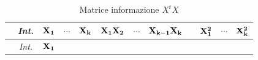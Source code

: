 \documentclass[
  11pt,
]{book}
\begin{document}
\begin{longtable}[]{@{}cccccccccccc@{}}
\caption{\label{tab:MatrInfoCCD} Matrice informazione \(X^tX\)}\tabularnewline
\toprule
\begin{minipage}[b]{0.09\columnwidth}\centering
\strut
\end{minipage} & \begin{minipage}[b]{0.05\columnwidth}\centering
\emph{Int.}\strut
\end{minipage} & \begin{minipage}[b]{0.05\columnwidth}\centering
\(\bf{X_1}\)\strut
\end{minipage} & \begin{minipage}[b]{0.05\columnwidth}\centering
\(\cdots\)\strut
\end{minipage} & \begin{minipage}[b]{0.05\columnwidth}\centering
\(\bf{X_k}\)\strut
\end{minipage} & \begin{minipage}[b]{0.07\columnwidth}\centering
\(\bf{X_1X_2}\)\strut
\end{minipage} & \begin{minipage}[b]{0.05\columnwidth}\centering
\(\cdots\)\strut
\end{minipage} & \begin{minipage}[b]{0.09\columnwidth}\centering
\(\bf{X_{k-1}X_k}\)\strut
\end{minipage} & \begin{minipage}[b]{0.02\columnwidth}\centering
\strut
\end{minipage} & \begin{minipage}[b]{0.06\columnwidth}\centering
\(\bf{X_1^2}\)\strut
\end{minipage} & \begin{minipage}[b]{0.05\columnwidth}\centering
\(\cdots\)\strut
\end{minipage} & \begin{minipage}[b]{0.06\columnwidth}\centering
\(\bf{X_k^2}\)\strut
\end{minipage}\tabularnewline
\midrule
\endfirsthead
\toprule
\begin{minipage}[b]{0.09\columnwidth}\centering
\strut
\end{minipage} & \begin{minipage}[b]{0.05\columnwidth}\centering
\emph{Int.}\strut
\end{minipage} & \begin{minipage}[b]{0.05\columnwidth}\centering
\(\bf{X_1}\)\strut
\end{minipage} & \begin{minipage}[b]{0.05\columnwidth}\centering

\end{minipage}
\end{longtable}
\end{document}

